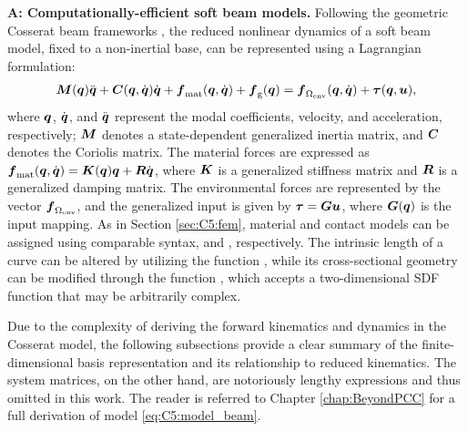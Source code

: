 \textbf{A: Computationally-efficient soft beam models.} Following the geometric Cosserat beam frameworks \cite{Renda2020,Boyer2021,Caasenbrood2021}, the reduced nonlinear dynamics of a soft beam model, fixed to a non-inertial base, can be represented using a Lagrangian formulation:
%
\begin{multline}
{\boldsymbol{M}}({\boldsymbol{q}}){\ddot{\boldsymbol{q}}} + {\boldsymbol{C}}({\boldsymbol{q}},{\dot{\boldsymbol{q}}}){\dot{\boldsymbol{q}}} + {\boldsymbol{f}}_{\textrm{mat}}({\boldsymbol{q}},{\dot{\boldsymbol{q}}}) + {\boldsymbol{f}}_{\scriptstyle\textrm{g}}({\boldsymbol{q}}) =  {\boldsymbol{f}}_{\Omega_{\textrm{env}}} ({\boldsymbol{q}},{\dot{\boldsymbol{q}}}) + \boldsymbol{\tau}({\boldsymbol{q}},{\boldsymbol{u}}),
\label{eq:C5:model_beam}
\end{multline}
%
where ${\boldsymbol{q}}$, ${\dot{\boldsymbol{q}}}$, and ${\ddot{\boldsymbol{q}}}$ represent the modal coefficients, velocity, and acceleration, respectively; ${\boldsymbol{M}}$ denotes a state-dependent generalized inertia matrix, and ${\boldsymbol{C}}$ denotes the Coriolis matrix. The material forces are expressed as ${\boldsymbol{f}}_{\textrm{mat}}({\boldsymbol{q}},{\dot{\boldsymbol{q}}}) = {\boldsymbol{K}}({\boldsymbol{q}}) {\boldsymbol{q}} + {\boldsymbol{R}} {\dot{\boldsymbol{q}}}$, where ${\boldsymbol{K}}$ is a generalized stiffness matrix and ${\boldsymbol{R}}$ is a generalized damping matrix. The environmental forces are represented by the vector ${\boldsymbol{f}}_{\Omega_{\textrm{env}}}$, and the generalized input is given by $\boldsymbol{\tau} = {\boldsymbol{G}} {\boldsymbol{u}}$, where ${\boldsymbol{G}}({\boldsymbol{q}})$ is the input mapping. As in Section \ref{sec:C5:fem}, material and contact models can be assigned using comparable syntax,  and , respectively. The intrinsic length of a curve can be altered by utilizing the function , while its cross-sectional geometry can be modified through the function , which accepts a two-dimensional SDF function that may be arbitrarily complex.

Due to the complexity of deriving the forward kinematics and dynamics in the Cosserat model, the following subsections provide a clear summary of the finite-dimensional basis representation and its relationship to reduced kinematics. The system matrices, on the other hand, are notoriously lengthy expressions and thus omitted in this work. The reader is referred to Chapter \ref{chap:BeyondPCC} for a full derivation of model \eqref{eq:C5:model_beam}.

